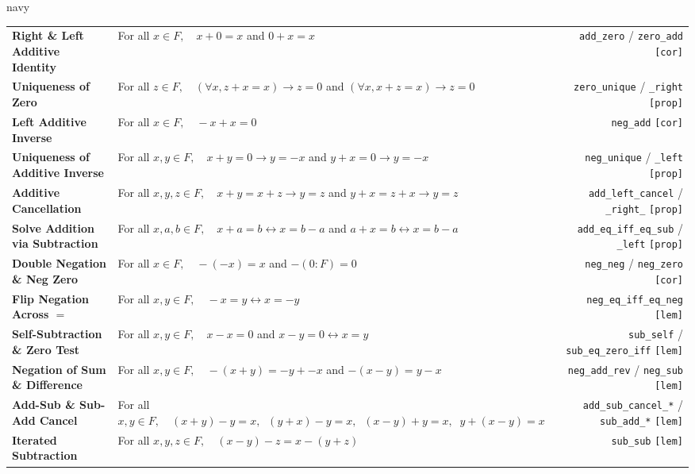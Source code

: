 \documentclass[10pt]{article}
\renewcommand{\arraystretch}{1.14}
\newcommand{\lean}[1]{\texttt{\scriptsize\color{navy}#1}}
\newcommand{\kind}[1]{\texttt{\scriptsize\color{muted}[#1]}}
\begin{document}
\renewcommand{\arraystretch}{1.01}

\begin{axbox}[title={Group 1: Additive Group (Identities, Uniqueness, Cancellation \& Subtraction)}]{navy}
\scriptsize
\begin{tabularx}{\linewidth}{@{}>{\raggedright\arraybackslash}p{4.2cm} >{\raggedright\arraybackslash}X r@{}}
\textbf{Right \& Left Additive Identity} & For all $x \in F,\quad x + 0 = x$ \quad and \quad $0 + x = x$ & \lean{add\_zero} / \lean{zero\_add} \kind{cor} \\
\textbf{Uniqueness of Zero} & For all $z \in F,\quad (\forall x, z + x = x) \to z = 0$ \quad and \quad $(\forall x, x + z = x) \to z = 0$ & \lean{zero\_unique} / \lean{\_right} \kind{prop} \\
\textbf{Left Additive Inverse} & For all $x \in F,\quad -x + x = 0$ & \lean{neg\_add} \kind{cor} \\
\textbf{Uniqueness of Additive Inverse} & For all $x, y \in F,\quad x + y = 0 \to y = -x$ \quad and \quad $y + x = 0 \to y = -x$ & \lean{neg\_unique} / \lean{\_left} \kind{prop} \\
\textbf{Additive Cancellation} & For all $x, y, z \in F,\quad x + y = x + z \to y = z$ \quad and \quad $y + x = z + x \to y = z$ & \lean{add\_left\_cancel} / \lean{\_right\_} \kind{prop} \\
\textbf{Solve Addition via Subtraction} & For all $x, a, b \in F,\quad x + a = b \leftrightarrow x = b - a$ \quad and \quad $a + x = b \leftrightarrow x = b - a$ & \lean{add\_eq\_iff\_eq\_sub} / \lean{\_left} \kind{prop} \\
\textbf{Double Negation \& Neg Zero} & For all $x \in F,\quad -(-x) = x$ \quad and \quad $-(0 : F) = 0$ & \lean{neg\_neg} / \lean{neg\_zero} \kind{cor} \\
\textbf{Flip Negation Across $=$} & For all $x, y \in F,\quad -x = y \leftrightarrow x = -y$ & \lean{neg\_eq\_iff\_eq\_neg} \kind{lem} \\
\textbf{Self-Subtraction \& Zero Test} & For all $x, y \in F,\quad x - x = 0$ \quad and \quad $x - y = 0 \leftrightarrow x = y$ & \lean{sub\_self} / \lean{sub\_eq\_zero\_iff} \kind{lem} \\
\textbf{Negation of Sum \& Difference} & For all $x, y \in F,\quad -(x + y) = -y + -x$ \quad and \quad $-(x - y) = y - x$ & \lean{neg\_add\_rev} / \lean{neg\_sub} \kind{lem} \\
\textbf{Add-Sub \& Sub-Add Cancel} & For all $x, y \in F,\quad (x + y) - y = x,\;\; (y + x) - y = x,\;\; (x - y) + y = x,\;\; y + (x - y) = x$ & \lean{add\_sub\_cancel\_*} / \lean{sub\_add\_*} \kind{lem} \\
\textbf{Iterated Subtraction} & For all $x, y, z \in F,\quad (x - y) - z = x - (y + z)$ & \lean{sub\_sub} \kind{lem} \\
\end{tabularx}
\end{axbox}
\end{document}
